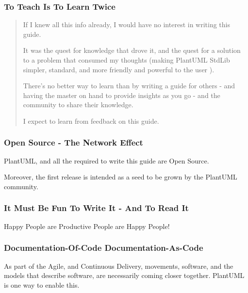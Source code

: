 \documentclass[letterpaper,10pt,english]{sphinxmanual}
\begin{document}
\subsubsection{To Teach Is To Learn Twice}
\label{\detokenize{about/AboutThisGuide:to-teach-is-to-learn-twice}}\begin{quote}

If I knew all this info already, I would have no interest in writing this guide.

It was the quest for knowledge that drove it, and the quest for a solution to a problem that consumed my thoughts (making PlantUML StdLib simpler, standard, and more friendly and powerful to the user ).

There’s no better way to learn than by writing a guide for others - and having the master on hand to provide insights as you go - and the community to share their knowledge.

I expect to learn from feedback on this guide.
\end{quote}


\subsubsection{Open Source - The Network Effect}
\label{\detokenize{about/AboutThisGuide:open-source-the-network-effect}}
PlantUML, and all the {\hyperref[\detokenize{about/AboutThisGuide:tools-label}]{}} required to write this guide are Open Source.

Moreover, the first release is intended as a seed to be grown by the PlantUML community.


\subsubsection{It Must Be Fun To Write It - And To Read It}
\label{\detokenize{about/AboutThisGuide:it-must-be-fun-to-write-it-and-to-read-it}}
Happy People are Productive People are Happy People!


\subsubsection{Documentation-Of-Code Documentation-As-Code}
\label{\detokenize{about/AboutThisGuide:documentation-of-code-documentation-as-code}}
As part of the Agile, and Continuous Delivery, movements, software, and the models that describe software, are necessarily coming closer together.
PlantUML is one way to enable this.
\end{document}
